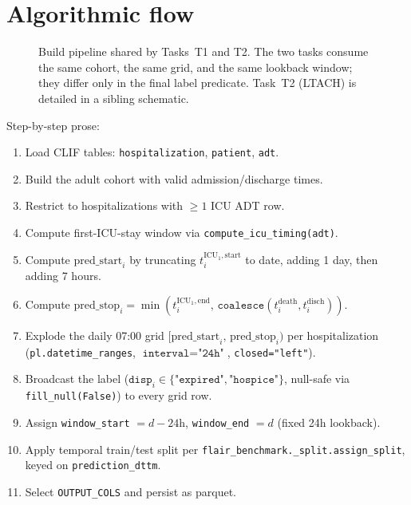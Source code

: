 \documentclass[11pt]{article}
\newcommand{\predstart}{\text{pred\_start}}
\newcommand{\predstop}{\text{pred\_stop}}
\begin{document}
\section{Algorithmic flow}
\label{sec:flow}

\begin{figure}[H]
\centering

\caption{Build pipeline shared by Tasks~T1 and T2. The two tasks
consume the same cohort, the same grid, and the same lookback window;
they differ only in the final label predicate. Task~T2 (LTACH) is
detailed in a sibling schematic.}
\label{fig:t1-flow}
\end{figure}

Step-by-step prose:

\begin{enumerate}[leftmargin=2em]
  \item Load CLIF tables: \texttt{hospitalization}, \texttt{patient},
        \texttt{adt}.
  \item Build the adult cohort with valid admission/discharge times.
  \item Restrict to hospitalizations with $\geq 1$ ICU ADT row.
  \item Compute first-ICU-stay window via
        \texttt{compute\_icu\_timing(adt)}.
  \item Compute $\predstart_i$ by truncating
        $t^{\text{ICU}_1,\text{start}}_i$ to date, adding 1 day, then
        adding 7 hours.
  \item Compute $\predstop_i =
        \min(t^{\text{ICU}_1,\text{end}}_i,\,
        \texttt{coalesce}(t^{\text{death}}_i, t^{\text{disch}}_i))$.
  \item Explode the daily 07:00 grid
        $[\predstart_i,\, \predstop_i)$ per hospitalization
        (\verb|pl.datetime_ranges|, $\texttt{interval}=\texttt{"24h"}$,
        \texttt{closed="left"}).
  \item Broadcast the label
        ($\texttt{disp}_i \in \{\texttt{"expired"},
        \texttt{"hospice"}\}$, null-safe via \texttt{fill\_null(False)})
        to every grid row.
  \item Assign \texttt{window\_start} $= d - 24\text{h}$,
        \texttt{window\_end} $= d$ (fixed 24h lookback).
  \item Apply temporal train/test split per
        \texttt{flair\_benchmark.\_split.assign\_split}, keyed on
        \texttt{prediction\_dttm}.
  \item Select \texttt{OUTPUT\_COLS} and persist as parquet.
\end{enumerate}
\end{document}
